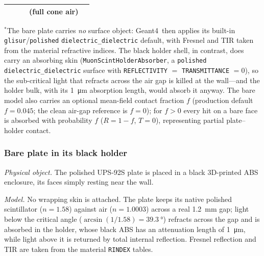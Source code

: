 \documentclass[11pt,a4paper]{article}
\newcommand{\gfour}{Geant4}
\begin{document}
\begin{table}[H]
\begin{tabularx}{\textwidth}{@{}>{\raggedright\arraybackslash}p{} C C C C@{}}
 & & & (full cone air) & \\
\bottomrule
\end{tabularx}
\par\vspace{3pt}
{\footnotesize $^{*}$The bare plate carries \emph{no} surface object: \gfour\
then applies its built-in \texttt{glisur}/\texttt{polished}
\texttt{dielectric\_dielectric} default, with Fresnel and TIR taken from the
material refractive indices. The black holder shell, in contrast, does carry an
absorbing skin (\texttt{MuonScintHolderAbsorber}, a \texttt{polished}
\texttt{dielectric\_dielectric} surface with \texttt{REFLECTIVITY} $=$
\texttt{TRANSMITTANCE} $=0$), so the sub-critical light that refracts across the
air gap is killed at the wall---and the holder bulk, with its
\SI{1}{\micro\meter} absorption length, would absorb it anyway. The bare model
also carries an optional mean-field contact fraction $f$ (production default
$f=\num{0.045}$; the clean air-gap reference is $f=0$); for $f>0$ every hit on
a bare face is absorbed with probability $f$ ($R=1-f$, $T=0$), representing
partial plate--holder contact.}
\end{table}

\subsubsection{Bare plate in its black holder}
\label{sec:refl-bare}

\emph{Physical object.} The polished UPS-92S plate is placed in a black
3D-printed ABS enclosure, its faces simply resting near the wall.

\emph{Model.} No wrapping skin is attached. The plate keeps its native polished
scintillator ($n=1.58$) against air ($n=1.0003$) across a real
\SI{1.2}{\milli\meter} gap; light below the critical angle
($\arcsin(1/1.58)=\SI{39.3}{\degree}$) refracts across the gap and is absorbed in
the holder, whose black ABS has an attenuation length of
\SI{1}{\micro\meter}, while light above it is returned by total internal
reflection. Fresnel reflection and TIR are taken from the material
\texttt{RINDEX} tables.
\end{document}
